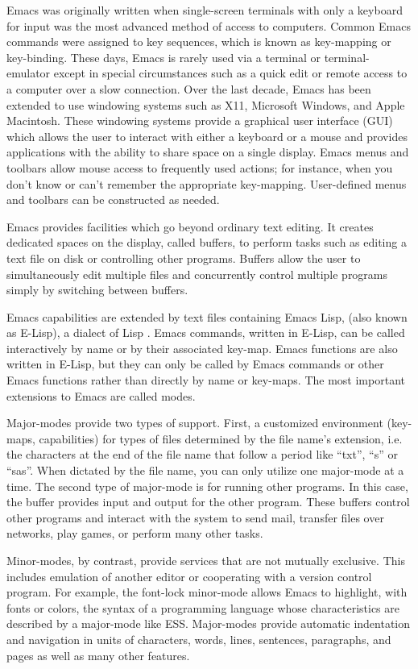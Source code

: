 \documentclass{article}
\begin{document}
Emacs was originally written when single-screen terminals with only a 
keyboard for input was the most advanced method of access to computers.  
Common Emacs commands were assigned to key sequences, which is known as 
key-mapping or key-binding.  These days, Emacs is rarely used via a 
terminal or terminal-emulator
except in special circumstances such as a quick edit or remote
access to a computer over a slow connection.  Over the last decade,
Emacs has been extended to use windowing systems such as X11,
Microsoft Windows, and Apple Macintosh.  These windowing systems
provide a graphical user interface (GUI) which allows the user to
interact with either a keyboard or a mouse and provides applications
with the ability to share space on a single display.  Emacs menus and
toolbars allow mouse access to frequently used actions; for instance,
when you don't know or can't remember the appropriate key-mapping.
User-defined menus and toolbars can be constructed as needed.

Emacs provides facilities which go beyond ordinary text editing.  It
creates dedicated spaces on the display, called buffers, to perform
tasks such as editing a text file on disk or controlling other
programs.  Buffers allow the user to simultaneously edit multiple files
and concurrently control multiple programs simply by switching between buffers.

Emacs capabilities are extended by text files containing Emacs Lisp,
(also known as E-Lisp), a dialect of Lisp
\citep{RChassell1999,PGraham:1996}.  Emacs commands, written
in E-Lisp, can be called interactively by name or by their associated key-map.  
Emacs functions are also written in E-Lisp, but they can only be 
called by Emacs commands or other Emacs functions rather than directly
by name or key-maps.  The most important extensions to
Emacs are called modes.  

Major-modes provide two types of support.
First, a customized environment (key-maps, capabilities) for types
of files determined by the file name's extension, i.e. the characters
at the end of the file name that follow a period like ``txt'', ``s''
or ``sas''.  When dictated by the file name, you can only
utilize one major-mode at a time. 
The second type of major-mode is for running other programs.  In this
case, the buffer provides input and output for the other program.  These
buffers control other programs and interact with the system to send mail,
transfer files over networks, play games, or perform many other tasks.

Minor-modes, by contrast, provide
services that are not mutually exclusive.  This includes emulation of
another editor or cooperating with a version control program.  For
example, the font-lock minor-mode allows Emacs to highlight, with
fonts or colors, the syntax of a programming language whose
characteristics are described by a major-mode like ESS.  Major-modes
provide automatic indentation and navigation in units of characters,
words, lines, sentences, paragraphs, and pages as well as many other
features.
\end{document}
